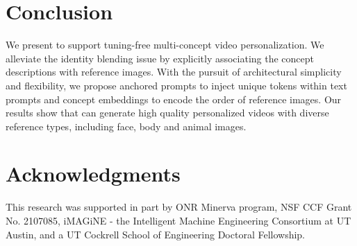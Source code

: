\section{Conclusion}

We present \workname to support tuning-free multi-concept video personalization. 
We alleviate the identity blending issue by explicitly associating the concept descriptions with reference images. 
With the pursuit of architectural simplicity and flexibility, we propose anchored prompts to inject unique tokens within text prompts and concept embeddings to encode the order of reference images.
Our results show that \workname can generate high quality personalized videos with diverse reference types, including face, body and animal images. 


\section*{Acknowledgments}
This research was supported in part by ONR Minerva program, NSF CCF Grant No. 2107085, iMAGiNE - the Intelligent Machine Engineering Consortium at UT Austin, and a UT Cockrell School of Engineering Doctoral Fellowship.